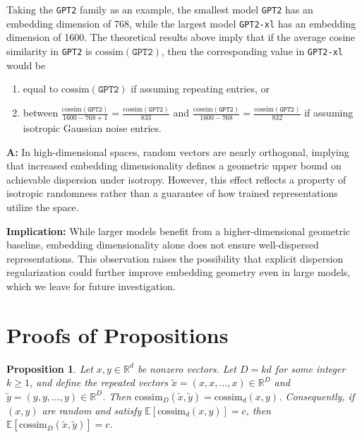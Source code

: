 \documentclass{article}
\theoremstyle{plain}
\newtheorem{proposition}[theorem]{Proposition}
\theoremstyle{definition}
\theoremstyle{remark}
\begin{document}
\begin{appendices}
Taking the \texttt{GPT2} family as an example, the smallest model \texttt{GPT2} has an embedding dimension of 768, while the largest model \texttt{GPT2-xl} has an embedding dimension of 1600. The theoretical results above imply that if the average cosine similarity in \texttt{GPT2} is $\mathrm{cossim}(\texttt{GPT2})$, then the corresponding value in \texttt{GPT2-xl} would be
\begin{enumerate}
    \item equal to $\mathrm{cossim}(\texttt{GPT2})$ if assuming repeating entries, or
    \item between $\frac{\mathrm{cossim}(\texttt{GPT2})}{1600-768+1}=\frac{\mathrm{cossim}(\texttt{GPT2})}{833}$ and $\frac{\mathrm{cossim}(\texttt{GPT2})}{1600-768}=\frac{\mathrm{cossim}(\texttt{GPT2})}{832}$ if assuming isotropic Gaussian noise entries.
\end{enumerate}

\begin{tcolorbox}[
    colback=natureblue!10,
    boxrule=1pt,
    arc=8pt,
    left=4pt,
    right=4pt,
    top=0pt,
    bottom=0pt
]
\textbf{A:} In high-dimensional spaces, random vectors are nearly orthogonal, implying that increased embedding dimensionality defines a geometric upper bound on achievable dispersion under isotropy. However, this effect reflects a property of isotropic randomness rather than a guarantee of how trained representations utilize the space.

\vspace{8pt}

\textbf{Implication:} While larger models benefit from a higher-dimensional geometric baseline, embedding dimensionality alone does not ensure well-dispersed representations. This observation raises the possibility that explicit dispersion regularization could further improve embedding geometry even in large models, which we leave for future investigation.
\end{tcolorbox}


\clearpage
\newpage
\section{Proofs of Propositions}

\begin{proposition}
\label{prop:repeat_invariant}
Let $x,y \in \mathbb{R}^d$ be nonzero vectors. Let $D = k d$ for some integer $k \ge 1$, and define the repeated vectors $\tilde x = (x,x,\ldots,x) \in \mathbb{R}^{D}$ and $\tilde y = (y,y,\ldots,y) \in \mathbb{R}^{D}$. Then $\mathrm{cossim}_{D}(\tilde x,\tilde y) = \mathrm{cossim}_{d}(x,y)$. Consequently, if $(x,y)$ are random and satisfy $\mathbb{E}[\mathrm{cossim}_{d}(x,y)] = c$, then $\mathbb{E}[\mathrm{cossim}_{D}(\tilde x,\tilde y)] = c$.
\end{proposition}


\end{appendices}
\end{document}
